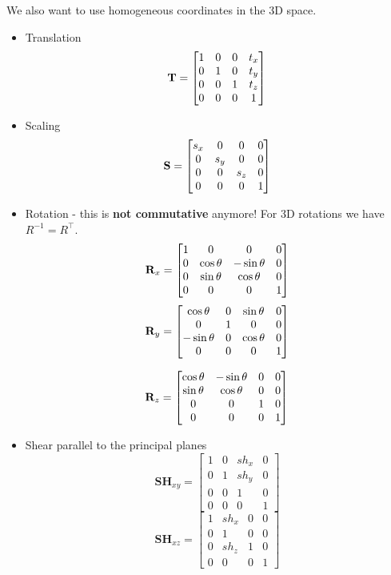 We also want to use homogeneous coordinates in the 3D space. 
\begin{itemize}
	\item Translation	
	$$\textbf T = \begin{bmatrix}
		1 & 0 & 0 & t_x \\ 0 & 1 & 0 & t_y \\ 0 & 0 & 1 & t_z \\ 0 & 0 & 0 & 1
	\end{bmatrix}$$
	
	\item Scaling
	$$\textbf S = \begin{bmatrix}
		s_x & 0 & 0 & 0 \\ 0 & s_y & 0 & 0 \\ 0 & 0 & s_z & 0 \\ 0 & 0 & 0 & 1
	\end{bmatrix}$$
	
	\item Rotation - this is \textbf{not commutative} anymore! For 3D rotations we have $R^{-1} = R^\top$.
	$$\textbf R_x = \begin{bmatrix}
		1 & 0 & 0 & 0 \\ 0 & \cos \theta & - \sin \theta & 0 \\ 0 & \sin \theta & \cos \theta & 0 \\ 0 & 0 & 0 & 1
	\end{bmatrix}$$
	$$\textbf R_y = \begin{bmatrix}
		\cos \theta & 0 & \sin \theta & 0 \\ 0 & 1 & 0 & 0 \\ -\sin \theta & 0 & \cos \theta & 0 \\ 0 & 0 & 0 & 1
	\end{bmatrix}$$
	
	$$\textbf R_z = \begin{bmatrix}
		\cos \theta & - \sin \theta & 0 & 0 \\ \sin \theta & \cos \theta & 0 & 0 \\ 0 & 0 & 1 & 0 \\ 0 & 0 & 0 & 1
	\end{bmatrix}$$
	
	\item Shear parallel to the principal planes
	$$\textbf{SH}_{xy} = \begin{bmatrix}
		1 & 0 & sh_x & 0\\ 0 & 1 & sh_y & 0 \\ 0 & 0 & 1 & 0 \\ 0 & 0 & 0 & 1
	\end{bmatrix}$$
	$$\textbf{SH}_{xz} = \begin{bmatrix}
		1 & sh_x & 0 & 0\\ 0 & 1 & 0 & 0 \\ 0 & sh_z & 1 & 0 \\ 0 & 0 & 0 & 1
	\end{bmatrix}$$
	

\end{itemize}
